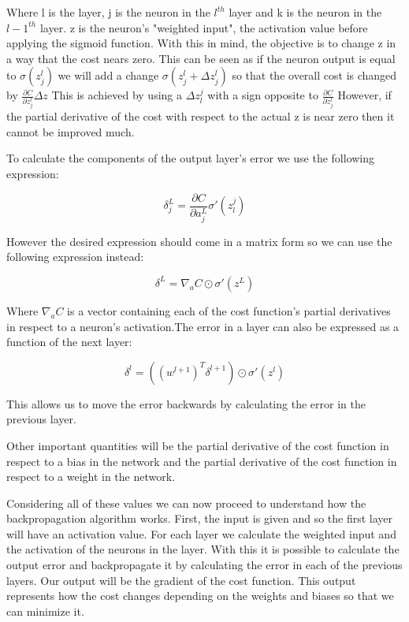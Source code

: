\documentclass[a4paper, 12pt]{amsart}
\begin{document}
Where l is the layer, j is the neuron in the $l^{th}$ layer and k is the neuron
in the $l-1^{th}$ layer. z is the neuron's "weighted input", the activation value before applying the sigmoid function. With this in mind, the objective is to change z in a way that the cost nears zero. This can be seen as if the neuron output is equal to $\sigma(z_j^l)$  we will add a change $\sigma(z_j^l + \Delta z_j^l)$ so that the overall cost is changed by $\frac{\partial C}{\partial z_j^l}\Delta z$ This is achieved by using a $\Delta z_l^j$ with a sign opposite to $\frac{\partial C}{\partial z_j^l}$ However, if the partial derivative of the cost with respect to the actual z is near zero then it cannot be improved much. 

To calculate the components of the output layer's error we use the following expression:

\[\delta^L_j = \frac{\partial C}{\partial a^L_j}\sigma '(z^j_l)\]

However the desired expression should come in a matrix form so we can use the following expression instead:

\[\delta^L = \nabla_a C \odot \sigma '(z^L)\]

Where $\nabla_a C$ is a vector containing each of the cost function's partial derivatives in respect to a neuron's activation.The error in a layer can also be expressed as a function of the next layer:

\[\delta^l = ((w^{l+1})^T\delta^{l+1})\odot\sigma '(z^l)\]

This allows us to move the error backwards by calculating the error in the previous layer.

Other important quantities will be the partial derivative of the cost function in respect to a bias in the network and the partial derivative of the cost function in respect to a weight in the network. 

Considering all of these values we can now proceed to understand how the backpropagation algorithm works. First, the input is given and so the first layer will have an activation value. For each layer we calculate the weighted input and the activation of the neurons in the layer. With this it is possible to calculate the output error and backpropagate it by calculating the error in each of the previous layers. Our output will be the gradient of the cost function. This output represents how the cost changes depending on the weights and biases so that we can minimize it. 
\end{document}
